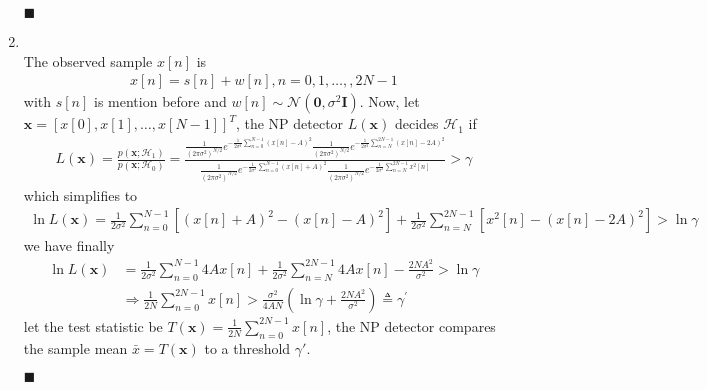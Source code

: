 \documentclass[a4paper,12pt]{article}
\begin{document}
\begin{enumerate}
\begin{flushright}
                $\blacksquare$
            \end{flushright}
        \item\ \\
            The observed sample $x[n]$ is
            \begin{align*}
                x[n]=s[n]+w[n],n=0,1,\ldots,,2N-1
            \end{align*}
            with $s[n]$ is mention before and $w[n]\sim\mathcal{N}(\textbf{0},\sigma^2\textbf{I})$.
            Now, let $\textbf{x}=[x[0],x[1],\dots,x[N-1]]^T$, the NP detector $L(\textbf{x})$ decides $\mathcal{H}_1$ if
            \begin{align*}
                L(\textbf{x})=\frac{p(\textbf{x};\mathcal{H}_1)}{p(\textbf{x};\mathcal{H}_0)}=\frac{\frac{1}{(2\pi\sigma^2)^{N/2}}e^{-\frac{1}{2\sigma^2}\sum \limits_{n=0}^{N-1}(x[n]-A)^2}\frac{1}{(2\pi\sigma^2)^{N/2}}e^{-\frac{1}{2\sigma^2}\sum \limits_{n=N}^{2N-1}(x[n]-2A)^2}}{\frac{1}{(2\pi\sigma^2)^{N/2}}e^{-\frac{1}{2\sigma^2}\sum \limits_{n=0}^{N-1}(x[n]+A)^2}\frac{1}{(2\pi\sigma^2)^{N/2}}e^{-\frac{1}{2\sigma^2}\sum \limits_{n=N}^{2N-1}x^2[n]}}>\gamma
            \end{align*}
            which simplifies to 
            \begin{align*}
                \ln L(\textbf{x})=\frac{1}{2\sigma^2}\sum \limits_{n=0}^{N-1}\left[ (x[n]+A)^2-(x[n]-A)^2\right]+\frac{1}{2\sigma^2}\sum \limits_{n=N}^{2N-1}\left[ x^2[n]-(x[n]-2A)^2\right]>\ln\gamma
            \end{align*}
            we have finally
            \begin{align*}
                \ln L(\textbf{x})&=\frac{1}{2\sigma^2}\sum\limits_{n=0}^{N-1}4Ax[n]+\frac{1}{2\sigma^2}\sum\limits_{n=N}^{2N-1}4Ax[n]-\frac{2NA^2}{\sigma^2}>\ln\gamma\\
                &\Rightarrow \frac{1}{2N}\sum\limits_{n=0}^{2N-1}x[n]>\frac{\sigma^2}{4AN}\left(\ln\gamma+\frac{2NA^2}{\sigma^2}\right) \triangleq \gamma^{'}
            \end{align*}
            let the test statistic be $T(\textbf{x})=\frac{1}{2N}\sum\limits_{n=0}^{2N-1}x[n]$, the NP detector compares the sample mean $\bar{x}=T(\textbf{x})$ to a threshold $\gamma'$.
            \begin{flushright}
                $\blacksquare$
            \end{flushright}
        

\end{enumerate}
\end{document}
